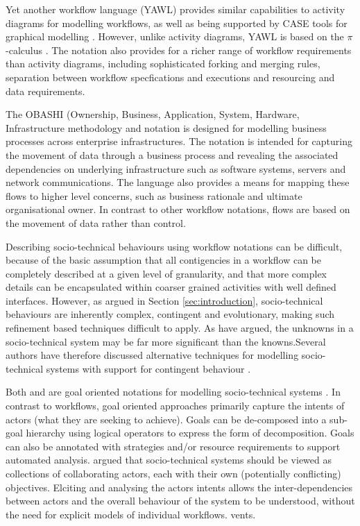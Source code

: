 \documentclass{sig-alternate}
\newcommand{\picalc}{\(\pi\)-calculus }
\begin{document}
Yet another workflow language (YAWL) provides similar capabilities to activity
diagrams for modelling workflows, as well as being supported by CASE tools for
graphical modelling \citep{hofstede2010yawl}.  However, unlike activity diagrams,
YAWL is based on the \picalc\citep{Aalst2004}.  The notation also provides for a
richer range of workflow requirements than activity diagrams, including
sophisticated forking and merging rules, separation between workflow
specfications and executions and resourcing and data requirements.

The OBASHI (Ownership, Business, Application, System, Hardware, Infrastructure
methodology and notation \citep{obashimethodology} is designed for modelling
business processes across enterprise infrastructures.  The notation is intended
for capturing the movement of data through a business process and revealing the
associated dependencies on underlying infrastructure such as software systems,
servers and network communications.  The language also provides a means for
mapping these flows to higher level concerns, such as business rationale and
ultimate organisational owner. In contrast to other workflow notations, flows
are based on the movement of data rather than control.


Describing socio-technical behaviours using workflow notations can be difficult,
because of the basic assumption that all contigencies in a workflow can be
completely described at a given level of granularity, and that more complex
details can be encapsulated within coarser grained activities with well defined
interfaces.  However, as argued in Section \ref{sec:introduction},
socio-technical behaviours are inherently complex, contingent and evolutionary,
making such refinement based techniques difficult to apply.  As
\citet{israilidis13ignorance} have argued, the unknowns in a socio-technical
system may be far more significant than the knowns.Several authors have
therefore discussed alternative techniques for modelling socio-technical systems
with support for contingent behaviour
\citep{yu1995,dardenne93goal,Herrmann1999,sommerville09deriving}.

Both \citet{yu1995} and \citet{dardenne93goal} are goal oriented notations for
modelling socio-technical systems \citep{Werneck2009}.  In contrast to workflows,
goal oriented approaches primarily capture the intents of actors (what they are
seeking to achieve).  Goals can be de-composed into a sub-goal hierarchy using
logical operators to express the form of decomposition. Goals can also be
annotated with strategies and/or resource requirements to support automated
analysis.  \citeauthor{yu1995} argued that socio-technical systems should be
viewed as collections of collaborating actors, each with their own (potentially
conflicting) objectives.  Elciting and analysing the actors intents allows the
inter-dependencies between actors and the overall behaviour of the system to be
understood, without the need for explicit models of individual workflows. vents.
\end{document}
